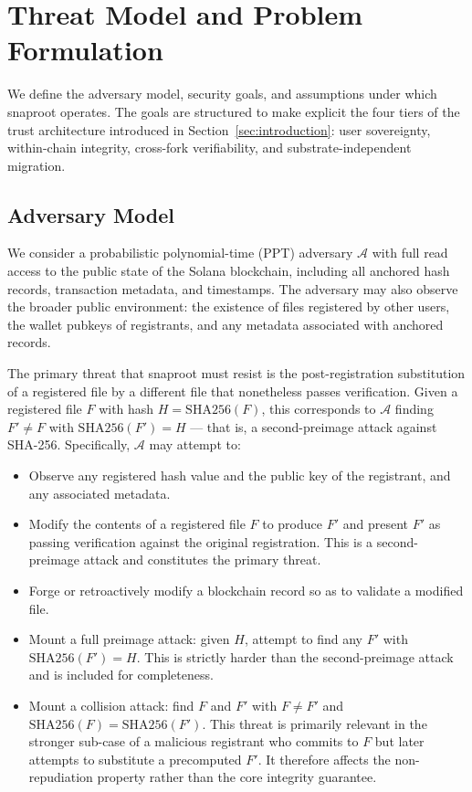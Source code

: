\documentclass[11pt,a4paper]{article}
\begin{document}
\section{Threat Model and Problem Formulation}
\label{sec:threat}

We define the adversary model, security goals, and assumptions under
which snaproot operates. The goals are structured to make explicit the
four tiers of the trust architecture introduced in
Section~\ref{sec:introduction}: user sovereignty, within-chain integrity,
cross-fork verifiability, and substrate-independent migration.

\subsection{Adversary Model}
\label{sec:threat:adversary}

We consider a probabilistic polynomial-time (PPT) adversary $\mathcal{A}$
with full read access to the public state of the Solana blockchain,
including all anchored hash records, transaction metadata, and timestamps.
The adversary may also observe the broader public environment: the
existence of files registered by other users, the wallet pubkeys of
registrants, and any metadata associated with anchored records.

The primary threat that snaproot must resist is the post-registration
substitution of a registered file by a different file that nonetheless
passes verification. Given a registered file $F$ with hash
$H = \mathrm{SHA256}(F)$, this corresponds to $\mathcal{A}$ finding
$F' \neq F$ with $\mathrm{SHA256}(F') = H$ --- that is, a second-preimage
attack against SHA-256. Specifically, $\mathcal{A}$ may attempt to:

\begin{itemize}
\item Observe any registered hash value and the public key of the
registrant, and any associated metadata.
\item Modify the contents of a registered file $F$ to produce $F'$ and
present $F'$ as passing verification against the original registration.
This is a second-preimage attack and constitutes the primary threat.
\item Forge or retroactively modify a blockchain record so as to
validate a modified file.
\item Mount a full preimage attack: given $H$, attempt to find any $F'$
with $\mathrm{SHA256}(F') = H$. This is strictly harder than the
second-preimage attack and is included for completeness.
\item Mount a collision attack: find $F$ and $F'$ with $F \neq F'$ and
$\mathrm{SHA256}(F) = \mathrm{SHA256}(F')$. This threat is primarily
relevant in the stronger sub-case of a malicious registrant who commits
to $F$ but later attempts to substitute a precomputed $F'$. It therefore
affects the non-repudiation property rather than the core integrity
guarantee.
\end{itemize}
\end{document}
